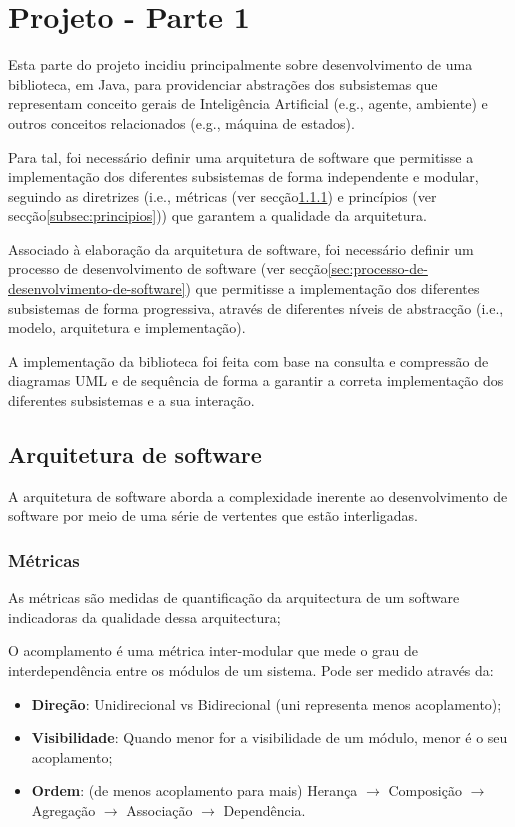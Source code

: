 \chapter{Projeto - Parte 1} \label{ch:projeto-parte1}

Esta parte do projeto incidiu principalmente sobre desenvolvimento de uma biblioteca, em Java, para providenciar abstrações dos subsistemas que representam conceito gerais de Inteligência Artificial (e.g., agente, ambiente) e outros conceitos relacionados (e.g., máquina de estados).

Para tal, foi necessário definir uma arquitetura de software que permitisse a implementação dos diferentes subsistemas de forma independente e modular, seguindo as diretrizes (i.e., métricas (ver secção\ref{subsec:metricas}) e princípios (ver secção\ref{subsec:principios})) que garantem a qualidade da arquitetura.

Associado à elaboração da arquitetura de software, foi necessário definir um processo de desenvolvimento de software (ver secção\ref{sec:processo-de-desenvolvimento-de-software}) que permitisse a implementação dos diferentes subsistemas de forma progressiva, através de diferentes níveis de abstracção (i.e., modelo, arquitetura e implementação).

A implementação da biblioteca foi feita com base na consulta e compressão de diagramas UML e de sequência de forma a garantir a correta implementação dos diferentes subsistemas e a sua interação.


\section{Arquitetura de software}\label{sec:arquitetura-de-software}

A arquitetura de software aborda a complexidade inerente ao desenvolvimento de software por meio de uma série de vertentes que estão interligadas.

\subsection{Métricas}\label{subsec:metricas}

As métricas são medidas de quantificação da arquitectura de um software indicadoras da qualidade dessa arquitectura;

O acomplamento é uma métrica inter-modular que mede o grau de interdependência entre os módulos de um sistema. Pode ser medido através da:
\begin{itemize}
    \item \textbf{Direção}: Unidirecional vs Bidirecional (uni representa menos acoplamento);
    \item \textbf{Visibilidade}: Quando menor for a visibilidade de um módulo, menor é o seu acoplamento;
    \item \textbf{Ordem}: (de menos acoplamento para mais) Herança $\rightarrow$ Composição $\rightarrow$ Agregação $\rightarrow$ Associação $\rightarrow$ Dependência.
\end{itemize}

